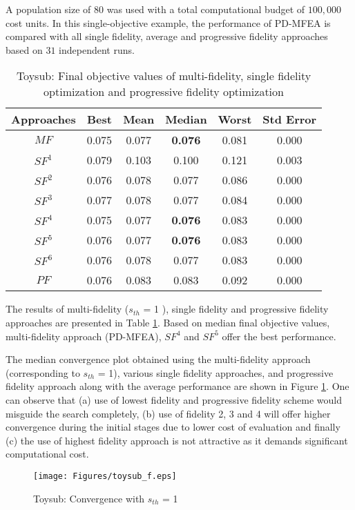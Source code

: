 A population size of $80$ was used with a total computational budget of $100,000$ cost units. In this single-objective example, the performance of PD-MFEA is compared with all single fidelity, average and progressive fidelity approaches based on $31$ independent runs.

\begin{table}[!htb]\footnotesize
	\caption{Toysub: Final objective values of multi-fidelity, single fidelity optimization and progressive fidelity optimization}
	\label{tab:toysub_all}
	\centering
	\begin{tabular}{|c|c|c|c|c|c|}
		\noalign{\smallskip}\hline
		Approaches& Best &Mean & Median & Worst & Std Error\\ \hline
		$MF$&0.075&0.077&\textbf{0.076}&0.081&0.000\\ \hline
		$SF^1$&0.079&0.103&0.100&0.121&0.003\\ \hline
		$SF^2$&0.076&0.078&0.077&0.086&0.000\\ \hline
		$SF^3$&0.077&0.078&0.077&0.084&0.000\\ \hline
		$SF^4$&0.075&0.077&\textbf{0.076}&0.083&0.000\\ \hline
		$SF^5$&0.076&0.077&\textbf{0.076}&0.083&0.000\\ \hline
		$SF^6$&0.076&0.078&0.077&0.083&0.000\\ \hline
		$PF$&0.076&0.083&0.083&0.092&0.000\\ 
		\hline
	\end{tabular}
\end{table}

The results of multi-fidelity ($s_{th}$ = 1 ), single fidelity and progressive fidelity approaches are presented in Table \ref{tab:toysub_all}. Based on median final objective values, multi-fidelity approach (PD-MFEA), $SF^4$ and $SF^5$ offer the best performance. 

The median convergence plot obtained using the multi-fidelity approach (corresponding to $s_{th}$ = 1), various single fidelity approaches, and progressive fidelity approach along with the average performance are shown in Figure \ref{fig:Meanplot_toysub_1sigma}. One can observe that (a) use of lowest fidelity and progressive fidelity scheme would misguide the search completely, (b) use of fidelity 2, 3 and 4 will offer higher convergence during the initial stages due to lower cost of evaluation and finally (c) the use of highest fidelity approach is not attractive as it demands significant computational cost.

\begin{figure}[ht]
	\centering
	\texttt{[image: Figures/toysub\_f.eps]}
	\caption{Toysub: Convergence with $s_{th}$ = 1}
	\label{fig:Meanplot_toysub_1sigma}
\end{figure}

